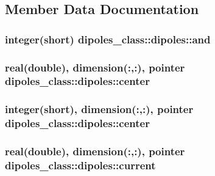 \subsection{Member Data Documentation}
\hypertarget{structdipoles__class_1_1dipoles_a7009b45719053d38b8b082f1505127cd}{
\subsubsection[{and}]{\setlength{\rightskip}{0pt plus 5cm}integer(short) dipoles\-\_\-class\-::dipoles\-::and\hspace{0.3cm}{\ttfamily [private]}}}\label{structdipoles__class_1_1dipoles_a7009b45719053d38b8b082f1505127cd}
\hypertarget{structdipoles__class_1_1dipoles_ab7c31b6af230c4668d6fd24b359836bf}{
\subsubsection[{center}]{\setlength{\rightskip}{0pt plus 5cm}real(double), dimension(\-:,\-:), pointer dipoles\-\_\-class\-::dipoles\-::center\hspace{0.3cm}{\ttfamily [private]}}}\label{structdipoles__class_1_1dipoles_ab7c31b6af230c4668d6fd24b359836bf}
\hypertarget{structdipoles__class_1_1dipoles_a959e48d8726c84ad96695f27f5a324df}{
\subsubsection[{center}]{\setlength{\rightskip}{0pt plus 5cm}integer(short), dimension(\-:,\-:), pointer dipoles\-\_\-class\-::dipoles\-::center\hspace{0.3cm}{\ttfamily [private]}}}\label{structdipoles__class_1_1dipoles_a959e48d8726c84ad96695f27f5a324df}
\hypertarget{structdipoles__class_1_1dipoles_a1f7d8ab8bd71a85a74e56b5461023742}{
\subsubsection[{current}]{\setlength{\rightskip}{0pt plus 5cm}real(double), dimension(\-:,\-:), pointer dipoles\-\_\-class\-::dipoles\-::current\hspace{0.3cm}{\ttfamily [private]}}}\label{structdipoles__class_1_1dipoles_a1f7d8ab8bd71a85a74e56b5461023742}
